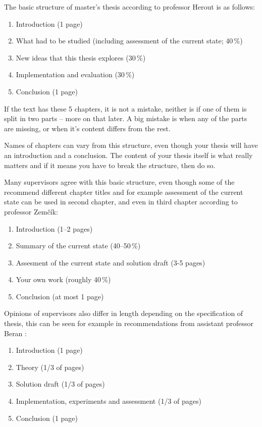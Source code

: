 The basic structure of master's thesis according to professor Herout is as follows:
\begin{enumerate}
  \item{Introduction (1 page)}
  \item{What had to be studied (including assessment of the current state; 40\,\%)}
  \item{New ideas that this thesis explores (30\,\%)}
  \item{Implementation and evaluation (30\,\%)}
  \item{Conclusion (1 page)}
\end{enumerate}

If the text has these 5 chapters, it is not a mistake, neither is if one of them is split in two parts -- more on that later. A big mistake is when any of the parts are missing, or when it's content differs from the rest.

Names of chapters can vary from this structure, even though your thesis will have an introduction and a conclusion. The content of your thesis itself is what really matters and if it means you have to break the structure, then do so.

Many supervisors agree with this basic structure, even though some of the recommend different chapter titles and for example assessment of the current state can be used in second chapter, and even in third chapter according to professor Zemčík:
\begin{enumerate}
\item Introduction (1--2 pages)
\item Summary of the current state (40--50\,\%)
\item Assesment of the current state and solution draft (3-5 pages)
\item Your own work (roughly 40\,\%)
\item Conclusion (at most 1 page)
\end{enumerate}

Opinions of supervisors also differ in length depending on the specification of thesis, this can be seen for example in recommendations from assistant professor Beran \cite{Beran}:
\begin{enumerate}
\item Introduction (1 page)
\item Theory (1/3 of pages)
\item Solution draft (1/3 of pages)
\item Implementation, experiments and assessment (1/3 of pages)
\item Conclusion (1 page)
\end{enumerate}

